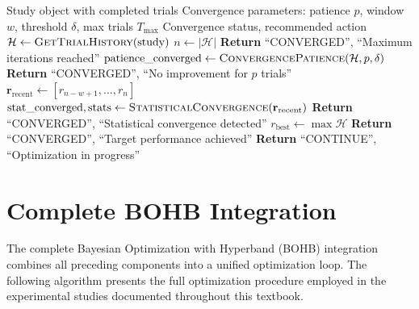 \begin{algorithm}[H]
\caption{Multi-Criteria Convergence Monitor}
\label{alg:convergence_monitor}
\begin{algorithmic}[1]
\Require Study object with completed trials
\Require Convergence parameters: patience $p$, window $w$, threshold $\delta$, max trials $T_{\max}$
\Ensure Convergence status, recommended action
\State $\mathcal{H} \gets \Call{GetTrialHistory}{\text{study}}$
\State $n \gets |\mathcal{H}|$
\State {}
    \State \textbf{Return} ``CONVERGED'', ``Maximum iterations reached''
\EndIf
\State {}
\State $\text{patience\_converged} \gets \Call{ConvergencePatience}{\mathcal{H}, p, \delta}$
    \State \textbf{Return} ``CONVERGED'', ``No improvement for $p$ trials''
\EndIf
\State {}
    \State $\mathbf{r}_{\text{recent}} \gets [r_{n-w+1}, \ldots, r_n]$
    \State $\text{stat\_converged}, \text{stats} \gets \Call{StatisticalConvergence}{\mathbf{r}_{\text{recent}}}$
        \State \textbf{Return} ``CONVERGED'', ``Statistical convergence detected''
    \EndIf
\EndIf
\State {}
\State $r_{\text{best}} \gets \max \mathcal{H}$
    \State \textbf{Return} ``CONVERGED'', ``Target performance achieved''
\EndIf
\State \textbf{Return} ``CONTINUE'', ``Optimization in progress''
\end{algorithmic}
\end{algorithm}

\section{Complete BOHB Integration}
\label{sec:bohb_integration}

The complete Bayesian Optimization with Hyperband (BOHB) integration combines all preceding components into a unified optimization loop. The following algorithm presents the full optimization procedure employed in the experimental studies documented throughout this textbook.

